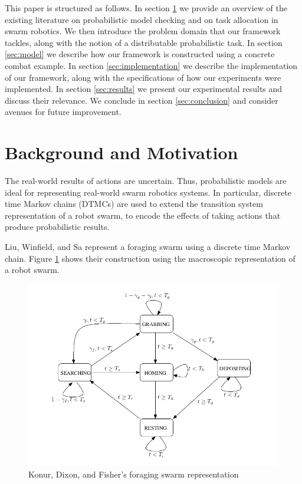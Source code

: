 \documentclass[11pt]{article}
\theoremstyle{definition}
\begin{document}
This paper is structured as follows.
%
In section \ref{sec:background-motivation} we provide an overview of the
existing literature on probabilistic model checking and on task allocation in
swarm robotics.
We then introduce the problem domain that our framework tackles, along with
the notion of a distributable probabilistic task.
%
In section \ref{sec:model} we describe how our framework is constructed using a
concrete combat example.
%
In section \ref{sec:implementation} we describe the implementation of our
framework, along with the specifications of how our experiments were
implemented.
%
In section \ref{sec:results} we present our experimental results and discuss
their relevance.
%
We conclude in section \ref{sec:conclusion} and consider avenues for future
improvement.

\section{Background and Motivation}
\label{sec:background-motivation}

The real-world results of actions are uncertain. Thus,
probabilistic models are ideal for representing
real-world swarm robotics systems.
In particular, discrete time Markov chains (DTMCs)
are used to extend the transition system representation
of a robot swarm, to encode the effects of taking actions
that produce probabilistic results.

Liu, Winfield, and Sa represent a foraging swarm
using a discrete time Markov chain. Figure \ref{fig:foraging}
shows their construction using the macroscopic
representation of a robot swarm.

\begin{figure}
    \caption{Konur, Dixon, and Fisher's foraging swarm representation}
    \label{fig:foraging}
    \includegraphics[width=\textwidth]{foraging.png}
\end{figure}
\end{document}
